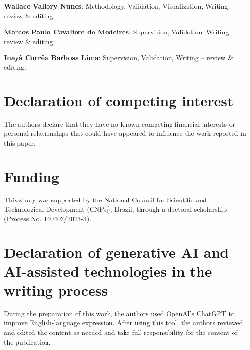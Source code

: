 \documentclass[12pt]{elsarticle}
\begin{document}
	\textbf{Wallace Vallory Nunes}: Methodology, Validation, Visualization,
	Writing -- review \& editing.
	
	\textbf{Marcos Paulo Cavaliere de Medeiros}: Supervision, Validation,
	Writing -- review \& editing.
	
	\textbf{Inay\'a Corr\^ea Barbosa Lima}: Supervision, Validation,
	Writing -- review \& editing.
		
	\section*{Declaration of competing interest}
	The authors declare that they have no known competing financial interests or personal relationships that could have appeared to influence the work reported in this paper.

	\section*{Funding}
	This study was supported by the National Council for Scientific and Technological Development (CNPq), Brazil, through a doctoral scholarship (Process No. 140402/2023-3).
	
	\section*{Declaration of generative AI and AI-assisted technologies in the writing process}
	During the preparation of this work, the authors used OpenAI's ChatGPT to improve English-language expression. After using this tool, the authors reviewed and edited the content as needed and take full responsibility for the content of the publication.
	
	
	
	
\end{document}
